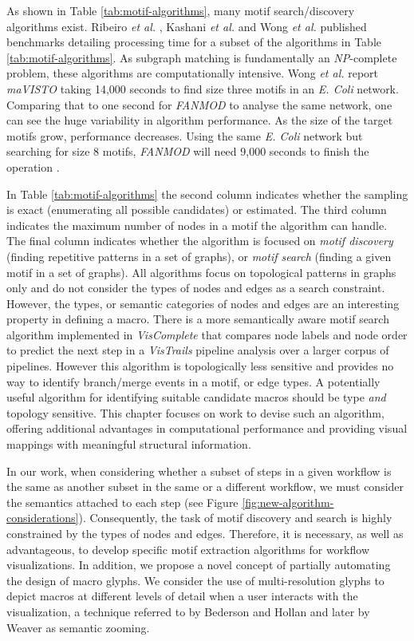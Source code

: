 As shown in Table \ref{tab:motif-algorithms}, many motif search/discovery algorithms exist. 
Ribeiro \emph{et al.} \cite{ribeiro10}, Kashani \emph{et al.} \cite{kashani09} and Wong \emph{et al.} \cite{Wong:2012} published benchmarks detailing processing time for a subset of the algorithms in Table \ref{tab:motif-algorithms}.
As subgraph matching is fundamentally an \emph{NP}-complete problem, these algorithms are computationally intensive.
Wong \emph{et al.} report \emph{maVISTO} taking 14,000 seconds to find size three motifs in an \emph{E. Coli} network.
Comparing that to one second for \emph{FANMOD} to analyse the same network, one can see the huge variability in algorithm performance.
As the size of the target motifs grow, performance decreases.
Using the same \emph{E. Coli} network but searching for size 8 motifs, \emph{FANMOD} will need 9,000 seconds to finish the operation \cite{Wong:2012}.

In Table \ref{tab:motif-algorithms} the second column indicates whether the sampling is exact (enumerating all possible candidates) or estimated.
The third column indicates the maximum number of nodes in a motif the algorithm can handle.
The final column indicates whether the algorithm is focused on \emph{motif discovery} (finding repetitive patterns in a set of graphs), or \emph{motif search} (finding a given motif in a set of graphs). 
All algorithms focus on topological patterns in graphs only and do not consider the types of nodes and edges as a search constraint. 
However, the types, or semantic categories of nodes and edges are an interesting property in defining a macro.
There is a more semantically aware motif search algorithm implemented in \emph{VisComplete} \cite{scheideggerquerying2007,koopviscomplete:2008} that compares node labels and node order to predict the next step in a \emph{VisTrails} pipeline analysis over a larger corpus of pipelines.
However this algorithm is topologically less sensitive and provides no way to identify branch/merge events in a motif, or edge types.
A potentially useful algorithm for identifying suitable candidate macros should be type \emph{and} topology sensitive.
This chapter focuses on work to devise such an algorithm, offering additional advantages in computational performance and providing visual mappings with meaningful structural information. 

In our work, when considering whether a subset of steps in a given workflow is the same as another subset in the same or a different workflow, we must consider the semantics attached to each step (see Figure \ref{fig:new-algorithm-considerations}).
Consequently, the task of motif discovery and search is highly constrained by the types of nodes and edges.
Therefore, it is necessary, as well as advantageous, to develop specific motif extraction algorithms for workflow visualizations.
In addition, we propose a novel concept of partially automating the design of macro glyphs.
We consider the use of multi-resolution glyphs to depict macros at different levels of detail when a user interacts with the visualization, a technique referred to by Bederson and Hollan \cite{bedersonpad:1994} and later by Weaver \cite{weaverbuilding2004} as semantic zooming. 

